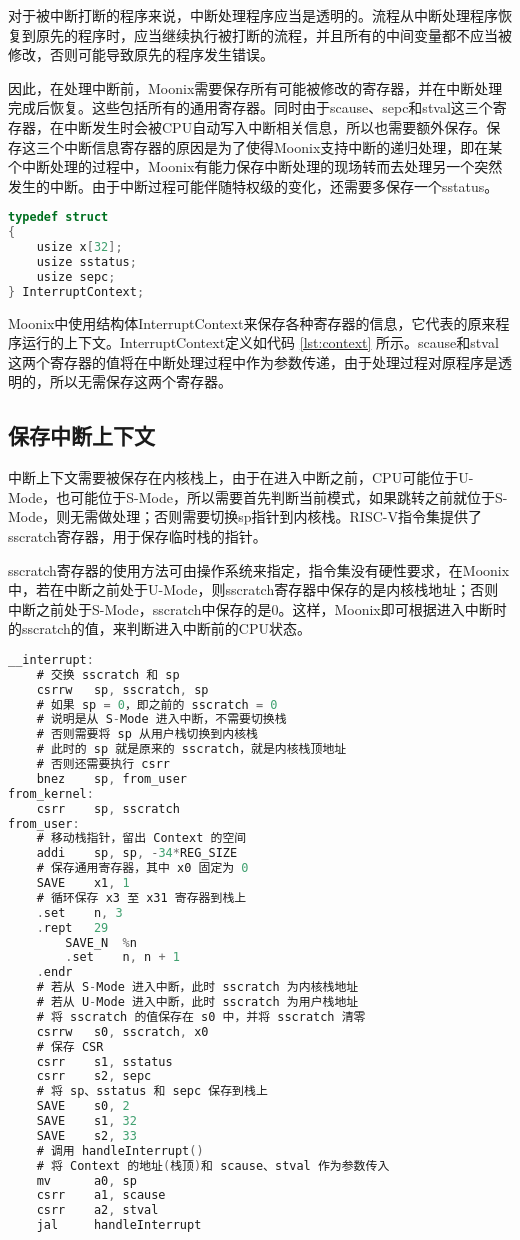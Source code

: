 对于被中断打断的程序来说，中断处理程序应当是透明的。流程从中断处理程序恢复到原先的程序时，应当继续执行被打断的流程，并且所有的中间变量都不应当被修改，否则可能导致原先的程序发生错误。

因此，在处理中断前，Moonix需要保存所有可能被修改的寄存器，并在中断处理完成后恢复。这些包括所有的通用寄存器。同时由于scause、sepc和stval这三个寄存器，在中断发生时会被CPU自动写入中断相关信息，所以也需要额外保存。保存这三个中断信息寄存器的原因是为了使得Moonix支持中断的递归处理，即在某个中断处理的过程中，Moonix有能力保存中断处理的现场转而去处理另一个突然发生的中断。由于中断过程可能伴随特权级的变化，还需要多保存一个sstatus。

\begin{lstlisting}[language={C}, caption={上下文结构定义}, label={lst:context}]
typedef struct
{
	usize x[32];
	usize sstatus;
	usize sepc;
} InterruptContext;
\end{lstlisting}

Moonix中使用结构体InterruptContext来保存各种寄存器的信息，它代表的原来程序运行的上下文。InterruptContext定义如代码 \ref{lst:context} 所示。scause和stval这两个寄存器的值将在中断处理过程中作为参数传递，由于处理过程对原程序是透明的，所以无需保存这两个寄存器。

\subsection{保存中断上下文}

中断上下文需要被保存在内核栈上，由于在进入中断之前，CPU可能位于U-Mode，也可能位于S-Mode，所以需要首先判断当前模式，如果跳转之前就位于S-Mode，则无需做处理；否则需要切换sp指针到内核栈。RISC-V指令集提供了sscratch寄存器，用于保存临时栈的指针。

sscratch寄存器的使用方法可由操作系统来指定，指令集没有硬性要求，在Moonix中，若在中断之前处于U-Mode，则sscratch寄存器中保存的是内核栈地址；否则中断之前处于S-Mode，sscratch中保存的是0。这样，Moonix即可根据进入中断时的sscratch的值，来判断进入中断前的CPU状态。

\clearpage

\begin{lstlisting}[language={C}, caption={保存中断上下文}, label={lst:savecontext}]
__interrupt:
	# 交换 sscratch 和 sp
	csrrw   sp, sscratch, sp
	# 如果 sp = 0，即之前的 sscratch = 0
	# 说明是从 S-Mode 进入中断，不需要切换栈
	# 否则需要将 sp 从用户栈切换到内核栈
	# 此时的 sp 就是原来的 sscratch，就是内核栈顶地址
	# 否则还需要执行 csrr 
	bnez    sp, from_user
from_kernel:
	csrr    sp, sscratch
from_user:
	# 移动栈指针，留出 Context 的空间
	addi    sp, sp, -34*REG_SIZE
	# 保存通用寄存器，其中 x0 固定为 0
	SAVE    x1, 1
	# 循环保存 x3 至 x31 寄存器到栈上
	.set    n, 3
	.rept   29
		SAVE_N  %n
		.set    n, n + 1
	.endr
	# 若从 S-Mode 进入中断，此时 sscratch 为内核栈地址
	# 若从 U-Mode 进入中断，此时 sscratch 为用户栈地址
	# 将 sscratch 的值保存在 s0 中，并将 sscratch 清零
	csrrw   s0, sscratch, x0
	# 保存 CSR
	csrr    s1, sstatus
	csrr    s2, sepc
	# 将 sp、sstatus 和 sepc 保存到栈上 
	SAVE    s0, 2
	SAVE    s1, 32
	SAVE    s2, 33
	# 调用 handleInterrupt()
	# 将 Context 的地址(栈顶)和 scause、stval 作为参数传入
	mv      a0, sp
	csrr    a1, scause
	csrr    a2, stval
	jal     handleInterrupt
\end{lstlisting}

